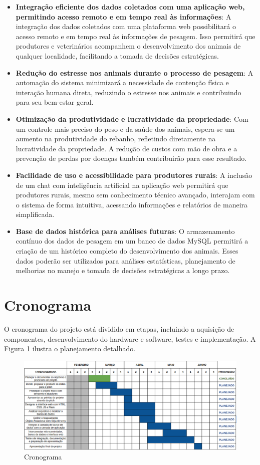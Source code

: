 \documentclass[11pt]{article}
\begin{document}
\begin{itemize}
\item \textbf{Integração eficiente dos dados coletados com uma aplicação web, permitindo acesso remoto e em tempo real às informações}: 
A integração dos dados coletados com uma plataforma web possibilitará o acesso remoto e em tempo real às informações de pesagem. Isso permitirá que produtores e veterinários acompanhem o desenvolvimento dos animais de qualquer localidade, facilitando a tomada de decisões estratégicas.

\item \textbf{Redução do estresse nos animais durante o processo de pesagem}: 
A automação do sistema minimizará a necessidade de contenção física e interação humana direta, reduzindo o estresse nos animais e contribuindo para seu bem-estar geral.

\item \textbf{Otimização da produtividade e lucratividade da propriedade}: 
Com um controle mais preciso do peso e da saúde dos animais, espera-se um aumento na produtividade do rebanho, refletindo diretamente na lucratividade da propriedade. A redução de custos com mão de obra e a prevenção de perdas por doenças também contribuirão para esse resultado.

\item \textbf{Facilidade de uso e acessibilidade para produtores rurais}: 
A inclusão de um chat com inteligência artificial na aplicação web permitirá que produtores rurais, mesmo sem conhecimento técnico avançado, interajam com o sistema de forma intuitiva, acessando informações e relatórios de maneira simplificada.

\item \textbf{Base de dados histórica para análises futuras}: 
O armazenamento contínuo dos dados de pesagem em um banco de dados MySQL permitirá a criação de um histórico completo do desenvolvimento dos animais. Esses dados poderão ser utilizados para análises estatísticas, planejamento de melhorias no manejo e tomada de decisões estratégicas a longo prazo.
\end{itemize}

\section{Cronograma}
O cronograma do projeto está dividido em etapas, incluindo a aquisição de componentes, desenvolvimento do hardware e software, testes e implementação. A Figura 1 ilustra o planejamento detalhado.

\begin{figure}[H]
    \centering
    \includegraphics[width=0.9\linewidth]{cronograma.png}
    \caption{Cronograma}
\end{figure}
\end{document}
